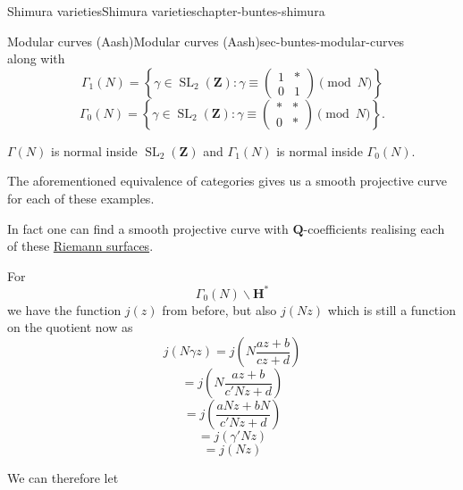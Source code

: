 \documentclass[oneside,10pt,]{book}
\numberwithin{equation}{section}
\newcommand{\ZZ}{\mathbf{Z}}
\newcommand{\QQ}{\mathbf{Q}}
\newcommand{\HH}{\mathbf{H}}
\DeclareMathOperator{\SL}{SL}
\newcommand{\amp}{&}
\begin{document}
\begin{chapterptx}{Shimura varieties}{}{Shimura varieties}{}{}{chapter-buntes-shimura}
\begin{sectionptx}{Modular curves (Aash)}{}{Modular curves (Aash)}{}{}{sec-buntes-modular-curves}
\begin{equation*}
\end{equation*}
along with%
\begin{equation*}
\Gamma_1(N) = \left\{ \gamma \in \SL_2(\ZZ) : \gamma \equiv \begin{pmatrix} 1\amp\ast \\ 0 \amp 1 \end{pmatrix} \pmod N \right\}
\end{equation*}
%
\begin{equation*}
\Gamma_0(N) = \left\{ \gamma \in \SL_2(\ZZ) : \gamma \equiv \begin{pmatrix} \ast\amp\ast \\ 0 \amp \ast \end{pmatrix} \pmod N \right\}\text{.}
\end{equation*}
%
\par
\hypertarget{p-1037}{}%
\(\Gamma(N)\) is normal inside \(\SL_2(\ZZ)\) and \(\Gamma_1(N)\) is normal inside \(\Gamma_0(N)\).%
\par
\hypertarget{p-1038}{}%
The aforementioned equivalence of categories gives us a smooth projective curve for each of these examples.%
\par
\hypertarget{p-1039}{}%
In fact one can find a smooth projective curve with \(\QQ\)-coefficients realising each of these \hyperref[def-top-riem-surface]{Riemann surfaces}.%
\par
\hypertarget{p-1040}{}%
For%
\begin{equation*}
\Gamma_0(N) \backslash \HH^*
\end{equation*}
we have the function \(j(z)\) from before, but also \(j(Nz)\) which is still a function on the quotient now as%
\begin{equation*}
j(N \gamma z) = j\left( N\frac{az + b}{cz+d} \right)
\end{equation*}
%
\begin{equation*}
= j\left( N\frac{az + b}{c'Nz+d} \right)
\end{equation*}
%
\begin{equation*}
= j\left( \frac{aNz + bN}{c'Nz+d} \right)
\end{equation*}
%
\begin{equation*}
= j\left( \gamma ' Nz\right)
\end{equation*}
%
\begin{equation*}
= j\left( Nz\right)
\end{equation*}
%
\par
\hypertarget{p-1041}{}%
We can therefore let%
\begin{equation*}

\end{equation*}
\end{sectionptx}
\end{chapterptx}
\end{document}

